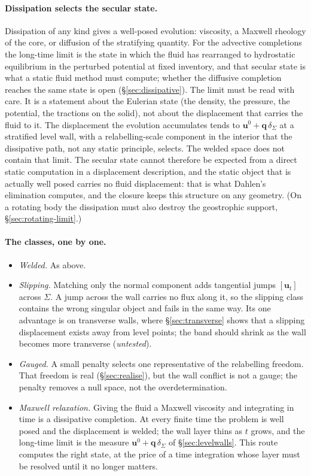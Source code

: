 \documentclass[11pt]{article}
\theoremstyle{definition}
\theoremstyle{remark}
\newcommand{\bu}{\mathbf{u}}
\newcommand{\bq}{\mathbf{q}}
\begin{document}
\paragraph{Dissipation selects the secular state.} Dissipation of any
kind gives a well-posed evolution: viscosity, a Maxwell rheology of the
core, or diffusion of the stratifying quantity. For the advective
completions the long-time limit is the state in which the fluid has
rearranged to hydrostatic equilibrium in the perturbed potential at
fixed inventory, and that secular state is what a static fluid method
must compute; whether the diffusive completion reaches the same state
is open (\S\ref{sec:dissipative}). The limit must be read with care. It is a
statement about the Eulerian state (the density, the pressure, the
potential, the tractions on the solid), not about the displacement
that carries the fluid to it. The displacement the evolution
accumulates tends to $\bu^0 + \bq\,\delta_\Sigma$ at a stratified level
wall, with a relabelling-scale component in the interior that the
dissipative path, not any static principle, selects. The welded space
does not contain that limit. The secular state cannot therefore be
expected from a direct static computation in a displacement
description, and the static object that is actually well posed carries
no fluid displacement: that is what Dahlen's elimination computes, and
the closure keeps this structure on any geometry. (On a rotating body
the dissipation must also destroy the geostrophic support,
\S\ref{sec:rotating-limit}.)

\paragraph{The classes, one by one.}
\begin{itemize}
\item \emph{Welded.} As above.
\item \emph{Slipping.} Matching only the normal component adds
  tangential jumps $[\bu_t]$ across $\Sigma$. A jump across the wall
  carries no flux along it, so the slipping class contains the wrong
  singular object and fails in the same way. Its one advantage is on
  transverse walls, where \S\ref{sec:transverse} shows that a slipping
  displacement exists away from level points; the band should shrink as
  the wall becomes more transverse (\emph{untested}).
\item \emph{Gauged.} A small penalty selects one representative of the
  relabelling freedom. That freedom is real (\S\ref{sec:realise}), but
  the wall conflict is not a gauge; the penalty removes a null space,
  not the overdetermination.
\item \emph{Maxwell relaxation.} Giving the fluid a Maxwell viscosity
  and integrating in time is a dissipative completion. At every finite
  time the problem is well posed and the displacement is welded; the
  wall layer thins as $t$ grows, and the long-time limit is the measure
  $\bu^0 + \bq\,\delta_\Sigma$ of \S\ref{sec:levelwalls}. This route
  computes the right state, at the price of a time integration whose
  layer must be resolved until it no longer matters.
\end{itemize}
\end{document}
